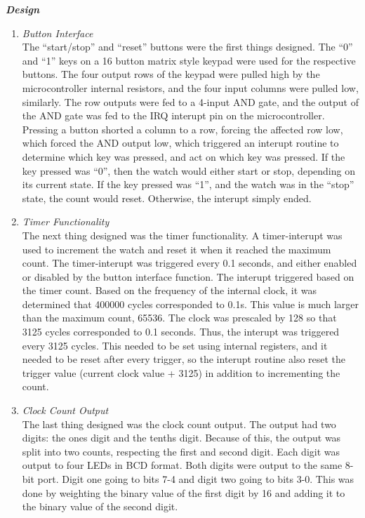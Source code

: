 \documentclass[10pt]{article}
\begin{document}
\emph{\textbf{Design}}
\begin{enumerate}
\item \emph{Button Interface}
\\The ``start/stop'' and ``reset'' buttons were the first things designed. 
The ``0'' and ``1'' keys on a 16 button matrix style keypad were used for the 
respective buttons. The four output rows of the keypad were pulled high by the 
microcontroller internal resistors, and the four input columns were pulled low, 
similarly.
The row outputs were fed to a 4-input AND gate, and the output of the AND 
gate was fed to the IRQ interupt pin on the microcontroller. 
Pressing a button shorted a column to a row, forcing the affected row low, which
forced the AND output low, which triggered an interupt routine to determine
which key was pressed, and act on which key was pressed. 
If the key pressed was ``0'', then the watch would either start or stop, depending
on its current state. If the key pressed was ``1'',  and the watch was in the 
``stop'' state, the count would reset. Otherwise, the interupt simply ended.
\item \emph{Timer Functionality}
\\The next thing designed was the timer functionality. A timer-interupt
was used to increment the watch and reset it when it reached
the maximum count. The timer-interupt was triggered every 0.1 seconds, and 
either enabled or disabled by the button interface function. The interupt
triggered based on the timer count.\cite{Nelson} Based on the frequency of the internal
clock, it was determined that 400000 cycles corresponded to 0.1s. This value
is much larger than the maximum count, 65536. The clock was prescaled
by 128 so that 3125 cycles corresponded to 0.1 seconds. Thus, the interupt
was triggered every 3125 cycles. This needed to be set using internal
registers, and it needed to be reset after every trigger, so the interupt
routine also reset the trigger value (current clock value + 3125) in 
addition to incrementing the count. 
\item \emph{Clock Count Output}
\\The last thing designed was the clock count output. The output had two
digits: the ones digit and the tenths digit. Because of this, the output
was split into two counts, respecting the first and second digit. 
Each digit was output to four LEDs in BCD format. Both digits were output
to the same 8-bit port. Digit one going to bits 7-4 and digit two going
to bits 3-0. This was done by weighting the binary value of the first digit
by 16 and adding it to the binary value of the second digit.
\end{enumerate}
\end{document}
